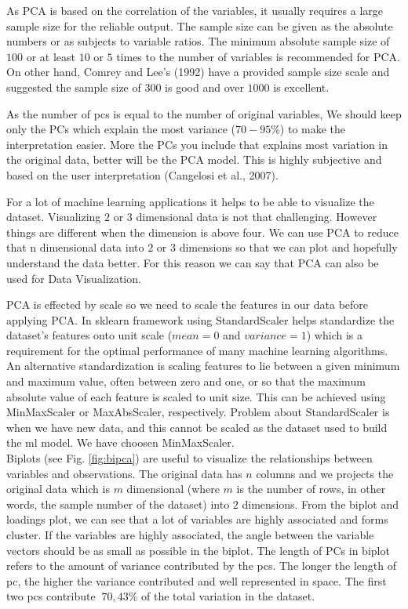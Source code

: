 \noindent As PCA is based on the correlation of the variables, it usually requires a large sample size for the reliable output. The sample size can be given as the absolute numbers or as subjects to variable ratios. The minimum absolute sample size of $100$ or at least $10$ or $5$ times to the number of variables is recommended for PCA. On other hand, Comrey and Lee’s (1992) have a provided sample size scale and suggested the sample size of $300$ is good and over $1000$ is excellent.

\noindent As the number of \glspl{pc} is equal to the number of original variables, We should keep only the PCs which explain the most variance ($70-95\%$) to make the interpretation easier. More the PCs you include that explains most variation in the original data, better will be the PCA model. This is highly subjective and based on the user interpretation (Cangelosi et al., 2007).

\noindent For a lot of machine learning applications it helps to be able to visualize the dataset. Visualizing $2$ or $3$ dimensional data is not that challenging. However things are different when the dimension is above four. We can use PCA to reduce that n dimensional data into $2$ or $3$ dimensions so that we can plot and hopefully understand the data better. For this reason we can say that PCA can also be used for Data Visualization. 

\noindent PCA is effected by scale so we need to scale the features in our data before applying PCA. In sklearn framework using StandardScaler helps standardize the dataset’s features onto unit scale ($mean = 0$ and $variance = 1$) which is a requirement for the optimal performance of many machine learning algorithms. An alternative standardization is scaling features to lie between a given minimum and maximum value, often between zero and one, or so that the maximum absolute value of each feature is scaled to unit size. This can be achieved using MinMaxScaler or MaxAbsScaler, respectively. Problem about StandardScaler is when we have new data, and this cannot be scaled as the dataset used to build the \gls{ml} model. We have choosen MinMaxScaler. \\

\noindent Biplots (see Fig. \ref{fig:bipca}) are useful to visualize the relationships between variables and observations. The original data has $n$ columns and we projects the original data which is $m$ dimensional (where $m$ is the number of rows, in other words, the sample number of the dataset) into $2$ dimensions. From the biplot and loadings plot, we can see that a lot of variables are highly associated and forms cluster. If the variables are highly associated, the angle between the variable vectors should be as small as possible in the biplot. The length of PCs in biplot refers to the amount of variance contributed by the \glspl{pc}. The longer the length of \gls{pc}, the higher the variance contributed and well represented in space. The first two \glspl{pc} contribute $~70,43\%$ of the total variation in the dataset.

